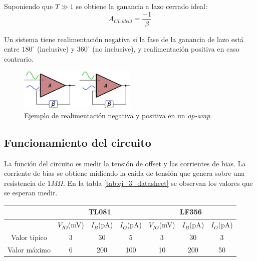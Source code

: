 \documentclass[../../main.tex]{subfiles}
\begin{document}
Suponiendo que $T\gg 1$ se obtiene la ganancia a lazo cerrado ideal:
\begin{equation}
	A_{CL\,ideal} = \frac{-1}{\beta}
	\label{eq:ej_3_ACL_IDEAL}
\end{equation}

Un sistema tiene realimentaci\'on negativa si la fase de la ganancia de lazo est\'a entre $180^\circ$ (inclusive) y $360^\circ$ (no inclusive), y realimentaci\'on positiva en caso contrario.

\begin{figure}[htbp] %
	\centering
	\includegraphics[width=0.5\textwidth]{imagenes/pos_vs_neg_feedback.png}
	\caption{Ejemplo de realimentaci\'on negativa y positiva en un \textit{op-amp}.}
	\label{fig:ej_3_realimentacion_pos_vs_neg_opamp}
\end{figure}










\subsection{Funcionamiento del circuito}
La funci\'on del circuito es medir la tensi\'on de offset y las corrientes de bias. La corriente de bias se obtiene midiendo la ca\'ida de tensi\'on que genera sobre una resistencia de $1M\Omega$. En la tabla \ref{tab:ej_3_datasheet} se observan los valores que se esperan medir.


\begin{table}[htbp]
\centering
\begin{tabular}{ccccccc}
               & \multicolumn{3}{c}{TL081}            & \multicolumn{3}{c}{LF356}    \\
\hline              
               & $V_{IO}$(mV) & $I_B$(pA) & $I_O$(pA) & $V_{IO}$(mV) & $I_B$(pA) & $I_O$(pA) \\
\hline
Valor t\'ipico & 3            & 30        & 5         & 3            & 30    & 3     \\
Valor m\'aximo & 6            & 200       & 100       & 10           & 200   & 50   
\end{tabular}
\end{table}
\end{document}
